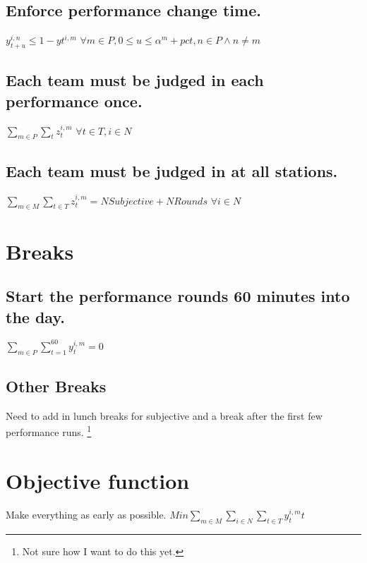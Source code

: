 \documentclass[letterpaper,11pt]{report}
\newcommand{\doccomment}[3]%
{\marginpar{\textcolor{#2}{\bf #1}}%
\footnote{{\color{#2}#3}}%
}
\newcommand{\doccomment}[3]{}
\newcommand{\jpscomment}[1]%
{\doccomment{SCHEWE}{Bittersweet}{#1}}
\begin{document}
\subsection{Enforce performance change time.}
$y_{t+u}^{i,n} \le 1 - y{t}^{i,m}$
\hfill $\forall m \in P, 0 \le u \le \alpha^{m} + pct, n \in P \wedge n \neq m$

\subsection{Each team must be judged in each performance once.}
$\sum\limits_{m \in P} \sum\limits_{t} z_{t}^{i,m}$
\hfill $\forall t \in T, i \in N$


\subsection{Each team must be judged in at all stations.}
$\sum\limits_{m \in M} \sum\limits_{t \in T} z_{t}^{i,m} = NSubjective +
NRounds$
\hfill $\forall i \in N$

\section{Breaks}
\subsection{Start the performance rounds 60 minutes into the day.}
$\sum\limits_{m \in P} \sum\limits_{t = 1}^{60} y_{t}^{i,m} = 0$

\subsection{Other Breaks}
Need to add in lunch breaks for subjective and a break after the first few
performance runs. \jpscomment{Not sure how I want to do this yet.}

\section{Objective function}
Make everything as early as possible.
$Min \sum\limits_{m \in M} \sum\limits_{i \in N} \sum\limits_{t \in T}
y_{t}^{i,m} t$
\end{document}
